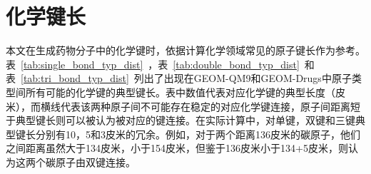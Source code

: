 {%

\section{化学键长}
本文在生成药物分子中的化学键时，依据计算化学领域常见的原子键长作为参考。表~\ref{tab:single_bond_typ_dist}~，表~\ref{tab:double_bond_typ_dist}~和表~\ref{tab:tri_bond_typ_dist}~列出了出现在GEOM-QM9和GEOM-Drugs中原子类型间所有可能的化学键的典型键长。表中数值代表对应化学键的典型长度（皮米），而横线代表该两种原子间不可能存在稳定的对应化学键连接，原子间距离短于典型键长则可以被认为被对应的键连接。在实际计算中，对单键，双键和三键典型键长分别有10，5和3皮米的冗余。例如，对于两个距离136皮米的碳原子，他们之间距离虽然大于134皮米，小于154皮米，但鉴于136皮米小于134+5皮米，则认为这两个碳原子由双键连接。

}
